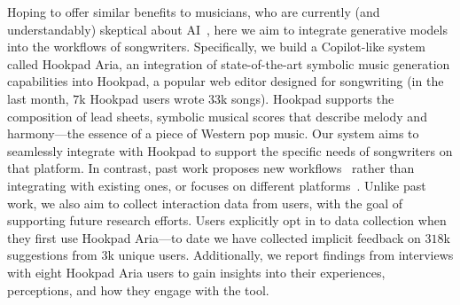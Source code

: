 \documentclass{article}
\newcommand\sysname{Hookpad Aria}
\newcommand\hookpad{Hookpad}
\newcommand{\yewon}[1]{{\color{blue}[YW: #1]}}
\begin{document}
Hoping to offer similar benefits to musicians, 
who are currently (and understandably) skeptical about AI~\cite{lovato2024foregrounding}, 
here we aim to integrate generative models into the workflows of songwriters. 
Specifically, we build a Copilot-like system called \sysname{}, 
an integration of state-of-the-art symbolic music generation capabilities into \hookpad{}, 
a popular web editor designed for songwriting (in the last month, $7$k \hookpad{} users wrote $33$k songs). 
\hookpad{} supports the composition of lead sheets, 
symbolic musical scores that describe melody and harmony---the essence of a piece of Western pop music. 
% 
Our system aims to seamlessly integrate with \hookpad{} to support the specific needs of songwriters on that platform. 
In contrast, 
past work proposes new workflows~\cite{huang2019bach,louie2020cococo} rather than integrating with existing ones, 
or focuses on different platforms~\cite{hadjeres2021piano,malandro2023composer,becker2024designing}. 
Unlike past work, 
we also aim to collect interaction data from users, 
with the goal of supporting future research efforts. 
Users explicitly opt in to data collection when they first use \sysname---to date we have collected implicit feedback on $318$k suggestions from $3$k unique users.
Additionally, we report findings from interviews with eight \sysname{} users to gain insights into their experiences, perceptions, and how they engage with the tool.






\end{document}
